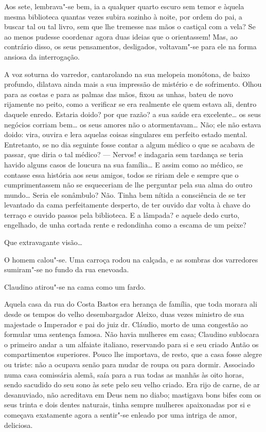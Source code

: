 Aos sete, lembrava"-se bem, ia a qualquer quarto escuro sem temor e
àquela mesma biblioteca quantas vezes subira sozinho à noite, por ordem
do pai, a buscar tal ou tal livro, sem que lhe tremesse nas mãos o
castiçal com a vela? Se ao menos pudesse coordenar agora duas ideias que
o orientassem! Mas, ao contrário disso, os seus pensamentos, desligados,
voltavam"-se para ele na forma ansiosa da interrogação.

A voz soturna do varredor, cantarolando na sua melopeia monótona, de
baixo profundo, dilatava ainda mais a sua impressão de mistério e de
sofrimento. Olhou para as costas e para as palmas das mãos, fixou as
unhas, bateu de novo rijamente no peito, como a verificar se era
realmente ele quem estava ali, dentro daquele enredo. Estaria doido? por
que razão? a sua saúde era excelente\ldots{} os seus negócios corriam bem\ldots{}
os seus amores não o atormentavam\ldots{} Não; ele não estava doido: vira,
ouvira e lera aquelas coisas singulares em perfeito estado mental.
Entretanto, se no dia seguinte fosse contar a algum médico o que se
acabava de passar, que diria o tal médico? --- Nervos! e indagaria sem
tardança se teria havido alguns casos de loucura na sua família\ldots{} E
assim como ao médico, se contasse essa história aos seus amigos, todos
se ririam dele e sempre que o cumprimentassem não se esqueceriam de lhe
perguntar pela sua alma do outro mundo\ldots{} Seria ele sonâmbulo? Não.
Tinha bem nítida a consciência de se ter levantado da cama perfeitamente
desperto, de ter ouvido dar volta à chave do terraço e ouvido passos
pela biblioteca. E a lâmpada? e aquele dedo curto, engelhado, de unha
cortada rente e redondinha como a escama de um peixe?

Que extravagante visão\ldots{}

O homem calou"-se. Uma carroça rodou na calçada, e as sombras dos
varredores sumiram"-se no fundo da rua enevoada.

Claudino atirou"-se na cama como um fardo.

\asterisc

Aquela casa da rua do Costa Bastos era herança de família, que toda
morara ali desde os tempos do velho desembargador Aleixo, duas vezes
ministro de sua majestade o Imperador e pai do juiz dr. Cláudio, morto
de uma congestão ao formular uma sentença famosa. Não havia mulheres em
casa; Claudino sublocara o primeiro andar a um alfaiate
italiano, reservando para si e seu criado Antão os compartimentos
superiores. Pouco lhe importava, de resto, que a casa fosse alegre ou
triste: não a ocupava senão para mudar de roupa ou para dormir.
Associado numa casa comissária alemã, saía para a rua todas as manhãs às
oito horas, sendo sacudido do seu sono às sete pelo seu velho criado.
Era rijo de carne, de ar desanuviado, não acreditava em Deus nem no
diabo; mastigava bons bifes com os seus trinta e dois dentes naturais,
tinha sempre mulheres apaixonadas por si e começava exatamente agora a
sentir"-se enleado por uma intriga de amor, deliciosa.

